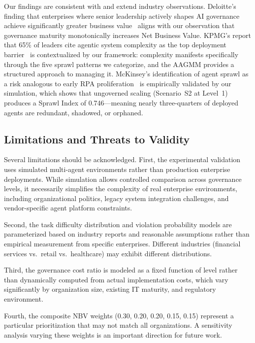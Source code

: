 \documentclass[ai,article,submit,pdftex,moreauthors]{Definitions/mdpi}
\begin{document}
Our findings are consistent with and extend industry observations. Deloitte's finding that enterprises where senior leadership actively shapes AI governance achieve significantly greater business value~\cite{deloitte2026state} aligns with our observation that governance maturity monotonically increases Net Business Value. KPMG's report that 65\% of leaders cite agentic system complexity as the top deployment barrier~\cite{kpmg2026q4pulse} is contextualized by our framework: complexity manifests specifically through the five sprawl patterns we categorize, and the AAGMM provides a structured approach to managing it. McKinsey's identification of agent sprawl as a risk analogous to early RPA proliferation~\cite{mckinsey2025seizing} is empirically validated by our simulation, which shows that ungoverned scaling (Scenario~S2 at Level~1) produces a Sprawl Index of 0.746---meaning nearly three-quarters of deployed agents are redundant, shadowed, or orphaned.

\subsection{Limitations and Threats to Validity}\label{sec:disc-limitations}

Several limitations should be acknowledged. First, the experimental validation uses simulated multi-agent environments rather than production enterprise deployments. While simulation allows controlled comparison across governance levels, it necessarily simplifies the complexity of real enterprise environments, including organizational politics, legacy system integration challenges, and vendor-specific agent platform constraints.

Second, the task difficulty distribution and violation probability models are parameterized based on industry reports and reasonable assumptions rather than empirical measurement from specific enterprises. Different industries (financial services vs.\ retail vs.\ healthcare) may exhibit different distributions.

Third, the governance cost ratio is modeled as a fixed function of level rather than dynamically computed from actual implementation costs, which vary significantly by organization size, existing IT maturity, and regulatory environment.

Fourth, the composite NBV weights (0.30, 0.20, 0.20, 0.15, 0.15) represent a particular prioritization that may not match all organizations. A sensitivity analysis varying these weights is an important direction for future work.
\end{document}
